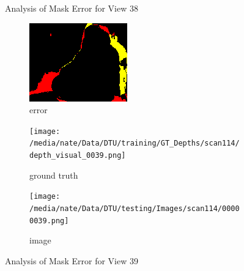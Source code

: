 \documentclass{article}
\begin{document}
\begin{figure}
\begin{subfigure}{0.3\textwidth}
		\label{fig:img38}
	\end{subfigure}
	\hfill
	\caption{Analysis of Mask Error for View 38}
	\label{fig:error_analys38}
\end{figure}\begin{figure}
	\centering
	\begin{subfigure}{0.3\textwidth}
		\centering
		\includegraphics[width=\textwidth]{./output/039_error.png}
		\caption{error}
		\label{fig:error39}
	\end{subfigure}
	\hfill
	\centering
	\begin{subfigure}{0.3\textwidth}
		\centering
		\texttt{[image: /media/nate/Data/DTU/training/GT\_Depths/scan114/depth\_visual\_0039.png]}
		\caption{ground truth}
		\label{fig:gt39}
	\end{subfigure}
	\hfill
	\centering
	\begin{subfigure}{0.3\textwidth}
		\centering
		\texttt{[image: /media/nate/Data/DTU/testing/Images/scan114/00000039.png]}
		\caption{image}
		\label{fig:img39}
	\end{subfigure}
	\hfill
	\caption{Analysis of Mask Error for View 39}
	\label{fig:error_analys39}
\end{figure}\begin{figure}
	\centering
	\begin{subfigure}{0.3\textwidth}
		\centering

\end{subfigure}
\end{figure}
\end{document}
